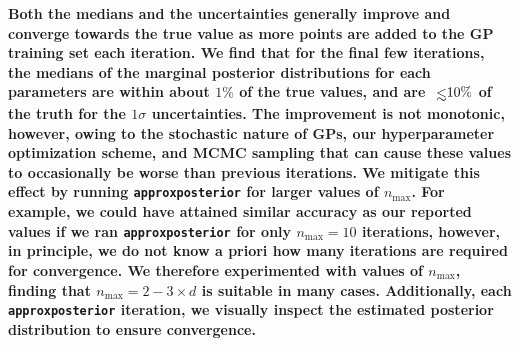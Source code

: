 \documentclass[twocolumn]{aastex62}
\def\lsim{~\rlap{$<$}{\lower 1.0ex\hbox{$\sim$}}}
\newcommand{\xxx}[1]{{\textbf{#1}}}
\newcommand{\approxposterior}[0]{\texttt{approxposterior}\xspace}
\begin{document}
\xxx{Both the medians and the uncertainties generally improve and converge towards the true value as more points are added to the GP training set each iteration. We find that for the final few iterations, the medians of the marginal posterior distributions for each parameters are within about $1\%$ of the true values, and are $\lsim 10\%$ of the truth for the $1\sigma$ uncertainties. The improvement is not monotonic, however, owing to the stochastic nature of GPs, our hyperparameter optimization scheme, and MCMC sampling that can cause these values to occasionally be worse than previous iterations. We mitigate this effect by running \approxposterior for larger values of $n_{\mathrm{max}}$. For example, we could have attained similar accuracy as our reported values if we ran \approxposterior for only $n_{\mathrm{max}} = 10$ iterations, however, in principle, we do not know a priori how many iterations are required for convergence. We therefore experimented with values of $n_{\mathrm{max}}$, finding that $n_{\mathrm{max}}=2-3 \times d$ is suitable in many cases. Additionally, each \approxposterior iteration, we visually inspect the estimated posterior distribution to ensure convergence.}
\end{document}
